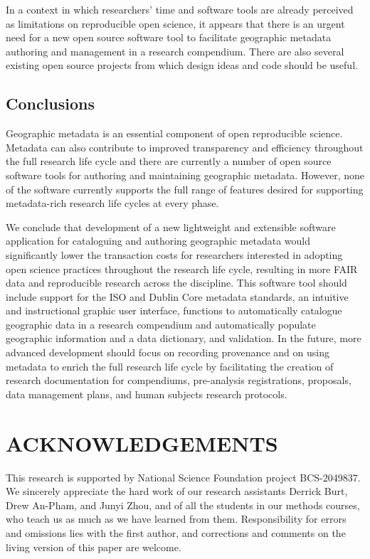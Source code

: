 \documentclass{isprs} %
\begin{document}
In a context in which researchers' time and software tools are already perceived as limitations on reproducible open science, it appears that there is an urgent need for a new open source software tool to facilitate geographic metadata authoring and management in a research compendium.
There are also several existing open source projects from which design ideas and code should be useful.

\subsection{Conclusions}

Geographic metadata is an essential component of open reproducible science.
Metadata can also contribute to improved transparency and efficiency throughout the full research life cycle and there are currently a number of open source software tools for authoring and maintaining geographic metadata.
However, none of the software currently supports the full range of features desired for supporting metadata-rich research life cycles at every phase.

We conclude that development of a new lightweight and extensible software application for cataloguing and authoring geographic metadata would significantly lower the transaction costs for researchers interested in adopting open science practices throughout the research life cycle, resulting in more FAIR data and reproducible research across the discipline. 
This software tool should include support for the ISO and Dublin Core metadata standards, an intuitive and instructional graphic user interface, functions to automatically catalogue geographic data in a research compendium and automatically populate geographic information and a data dictionary, and validation.
In the future, more advanced development should focus on recording provenance and on using metadata to enrich the full research life cycle by facilitating the creation of research documentation for compendiums, pre-analysis registrations, proposals, data management plans, and human subjects research protocols.


\section*{ACKNOWLEDGEMENTS}\label{ACKNOWLEDGEMENTS}
This research is supported by National Science Foundation project BCS-2049837.
We sincerely appreciate the hard work of our research assistants Derrick Burt, Drew An-Pham, and Junyi Zhou, and of all the students in our methods courses, who teach us as much as we have learned from them. 
Responsibility for errors and omissions lies with the first author, and corrections and comments on the living version \citep{foss4g2022} of this paper are welcome.

{
	\begin{spacing}{1.17}
		\normalsize
		 
	\end{spacing}
}
\end{document}
